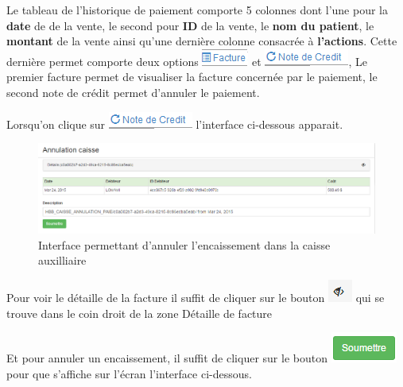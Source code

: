 \documentclass[12pt,a4paper]{report}
\begin{document}
Le tableau de l'historique de paiement comporte 5 colonnes dont l'une pour la\textbf{ date} de de la vente, le second pour \textbf{ID }de la vente, le \textbf{nom du patient}, le \textbf{montant} de la vente ainsi qu'une dernière colonne consacrée à \textbf{l'actions}. Cette dernière permet comporte deux options \includegraphics[scale=0.7]{pic/FactureF.png}  et \includegraphics[scale=0.7]{pic/NoteCredit.png}, Le premier facture permet de visualiser la facture concernée par le paiement, le second note de crédit permet d'annuler le paiement. 

Lorsqu'on clique sur \includegraphics[scale=0.7]{pic/NoteCredit.png}  l'interface ci-dessous apparait.

\begin{figure}[h]
\begin{center}
\includegraphics[width=14cm]{pic/AnnulationCaisseAux.png}
\end{center}
\caption{Interface permettant d'annuler l'encaissement dans la caisse auxilliaire}
\label{Interface permettant d'annuler l'encaissement dans la caisse auxilliaire}
\end{figure}

Pour voir le détaille de la facture il suffit de cliquer sur le bouton \includegraphics[scale=0.7]{pic/SeeInvoice.png} qui se trouve dans le coin droit de la zone Détaille de facture   


Et pour annuler un encaissement, il suffit de cliquer sur le bouton \includegraphics[scale=0.7]{pic/soumettreGreen.png}  pour que s'affiche sur l'écran l'interface ci-dessous.
\end{document}
